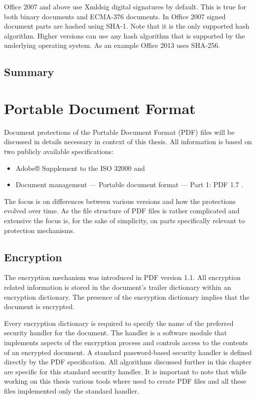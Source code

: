\documentclass[11pt,oneside]{fithesis2}
\begin{document}
Office 2007 and above use Xmldsig digital signatures by default. This is true for both binary documents and ECMA-376 documents. In Office 2007 signed document parts are hashed using SHA-1. Note that it is the only supported hash algorithm. Higher versions can use any hash algorithm that is supported by the underlying operating system. As an example Office 2013 uses SHA-256.

\section{Summary}

\chapter{Portable Document Format}

Document protections of the Portable Document Format (PDF) files will be discussed in details necessary in context of this thesis. All information is based on two publicly available specifications:

\begin{itemize}
\setlength\itemsep{0.1em}
\item{Adobe® Supplement to the ISO 32000 \cite{iso32000sup} and}
\item{Document management — Portable document format — Part 1: PDF 1.7 \cite{pdf_spec}.}
\end{itemize}

The focus is on differences between various versions and how the protections evolved over time. As the file structure of PDF files is rather complicated and extensive the focus is, for the sake of simplicity, on parts specifically relevant to protection mechanisms.

\section{Encryption}

The encryption mechanism was introduced in PDF version 1.1. All encryption related information is stored in the document's trailer dictionary \cite[p. 42]{pdf_spec} within an encryption dictionary. The presence of the encryption dictionary implies that the document is encrypted.

Every encryption dictionary is required to specify the name of the preferred security handler for the document. The handler is a software module that implements aspects of the encryption process and controls access to the contents of an encrypted document. A standard password-based security handler is defined directly by the PDF specification. All algorithms discussed further in this chapter are specific for this standard security handler. It is important to note that while working on this thesis various tools where used to create PDF files and all these files implemented only the standard handler.
\end{document}
